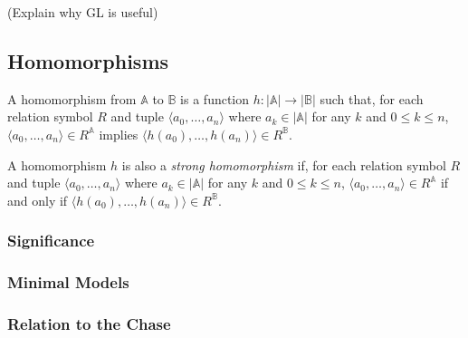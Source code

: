 		(Explain why GL is useful)


	\subsection{Homomorphisms}

	A homomorphism from $\mathbb{A}$ to $\mathbb{B}$ is a function $h:
	|\mathbb{A}|\to|\mathbb{B}|$ such that, for each relation symbol $R$ and
	tuple $\langle a_0 , \ldots , a_n \rangle$ where $a_k \in |\mathbb{A}|$ for
	any $k$ and $0 \le k \le n$, $\langle a_0 , \ldots , a_n  \rangle \in
	R^\mathbb{A}$ implies $\langle h(a_0) , \ldots , h(a_n)  \rangle \in
	R^\mathbb{B}$.
	
	A homomorphism $h$ is also a \emph{strong homomorphism} if, for each
	relation symbol $R$ and tuple $\langle a_0 , \ldots , a_n \rangle$ where
	$a_k \in |\mathbb{A}|$ for any $k$ and $0 \le k \le n$, $\langle a_0 ,
	\ldots , a_n  \rangle \in R^\mathbb{A}$ if and only if $\langle h(a_0) ,
	\ldots , h(a_n)  \rangle \in R^\mathbb{B}$.

		\subsubsection{Significance}

		\subsubsection{Minimal Models}

		\subsubsection{Relation to the Chase}
